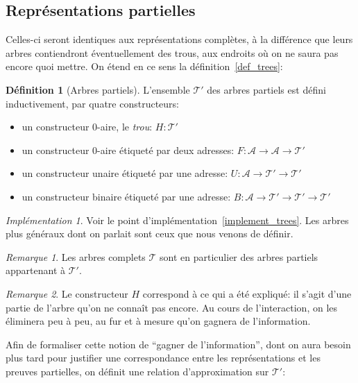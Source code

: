 \documentclass[11pt,a4paper]{article}
\theoremstyle{plain}
\theoremstyle{definition}
\newtheorem{definition}{Définition}
\theoremstyle{remark}
\newtheorem{remark}{Remarque}
\newtheorem{implementation}{Implémentation}
\newcommand*{\trees}{\ensuremath{\mathcal{T}}}
\newcommand*{\treespartial}{\ensuremath{\mathcal{T'}}}
\newcommand*{\unknown}{H}
\begin{document}
\subsection{Représentations partielles}
\label{partial_rep}

Celles-ci seront identiques aux représentations complètes, à la différence que leurs arbres contiendront éventuellement des trous, aux endroits où on ne saura pas encore quoi mettre. On étend en ce sens la définition~\ref{def_trees}:

\begin{definition}[Arbres partiels]
    L'ensemble \treespartial{} des arbres partiels est défini inductivement, par quatre constructeurs:
    \begin{itemize}
      \item un constructeur $0$-aire, le \emph{trou}: $\unknown: \treespartial$
      \item un constructeur $0$-aire étiqueté par deux adresses: $F: \mathcal{A} \rightarrow \mathcal{A} \rightarrow \treespartial$
      \item un constructeur unaire étiqueté par une adresse: $U: \mathcal{A} \rightarrow \treespartial \rightarrow \treespartial$
      \item un constructeur binaire étiqueté par une adresse: $B: \mathcal{A} \rightarrow \treespartial \rightarrow \treespartial \rightarrow \treespartial$
    \end{itemize}
\end{definition}

\begin{implementation}
    Voir le point d'implémentation~\ref{implement_trees}. Les arbres plus généraux dont on parlait sont ceux que nous venons de définir.
\end{implementation}

\begin{remark}
    Les arbres complets \trees{} sont en particulier des arbres partiels appartenant à \treespartial{}.
\end{remark}

\begin{remark}
    Le constructeur $\unknown$ correspond à ce qui a été expliqué: il s'agit d'une partie de l'arbre qu'on ne connaît pas encore. Au cours de l'interaction, on les éliminera peu à peu, au fur et à mesure qu'on gagnera de l'information.
\end{remark}

Afin de formaliser cette notion de ``gagner de l'information'', dont on aura besoin plus tard pour justifier une correspondance entre les représentations et les preuves partielles, on définit une relation d'approximation sur \treespartial{}:
\end{document}
